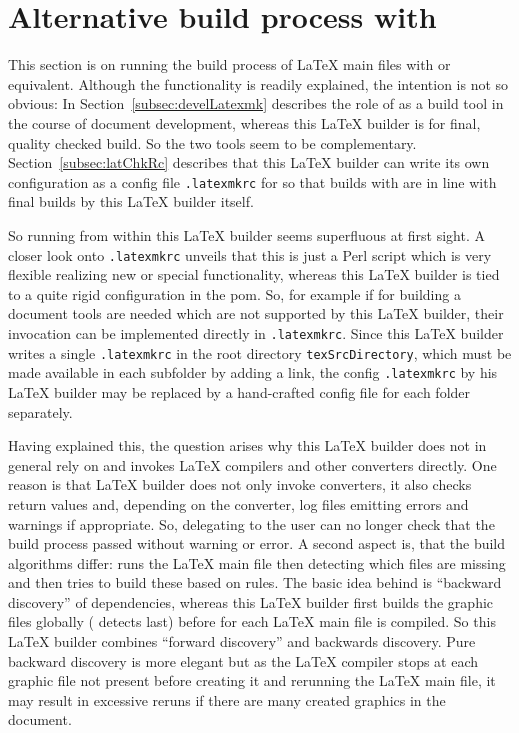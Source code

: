 \section{Alternative build process with \protect{}}\label{sec:latexmk}%

This section is on running the build process of \LaTeX{} main files 
with  or equivalent. 
Although the functionality is readily explained, 
the intention is not so obvious: 
In Section~\ref{subsec:develLatexmk} 
describes the role of  as a build tool 
in the course of document development, 
whereas this \LaTeX{} builder is for final, quality checked build. 
So the two tools seem to be complementary. 
Section~\ref{subsec:latChkRc} describes that this \LaTeX{} builder 
can write its own configuration as 
a config file \texttt{.latexmkrc} for  
so that builds with  are in line 
with final builds by this \LaTeX{} builder itself. 

So running  from within this \LaTeX{} builder 
seems superfluous at first sight. 
A closer look onto \texttt{.latexmkrc} unveils that this is just a Perl script 
which is very flexible realizing new or special functionality, 
whereas this \LaTeX{} builder is tied to a quite rigid configuration in the pom. 
So, for example if for building a document tools are needed 
which are not supported by this \LaTeX{} builder, 
their invocation can be implemented directly in \texttt{.latexmkrc}. 
Since this \LaTeX{} builder writes a single \texttt{.latexmkrc} 
in the root directory \texttt{texSrcDirectory}, 
which must be made available in each subfolder by adding a link, 
the config \texttt{.latexmkrc} by his \LaTeX{} builder 
may be replaced by a hand-crafted config file for each folder separately. 

Having explained this, the question arises 
why this \LaTeX{} builder does not in general rely on  
and invokes \LaTeX{} compilers and other converters directly. 
One reason is that \LaTeX{} builder does not only invoke converters, 
it also checks return values and, depending on the converter, 
log files emitting errors and warnings if appropriate. 
So, delegating to  
the user can no longer check that the build process passed without warning or error. 
A second aspect is, that the build algorithms differ: 
 runs the \LaTeX{} main file then detecting which files are missing 
and then tries to build these based on rules. 
The basic idea behind is ``backward discovery'' of dependencies, 
whereas this \LaTeX{} builder first builds the graphic files globally 
( detects last) 
before for each \LaTeX{} main file is compiled. 
So this \LaTeX{} builder combines ``forward discovery'' and backwards discovery. 
Pure  backward discovery is more elegant 
but as the \LaTeX{} compiler stops at each graphic file not present 
before creating it and rerunning the \LaTeX{} main file, 
it may result in excessive reruns if there are many created graphics in the document. 

